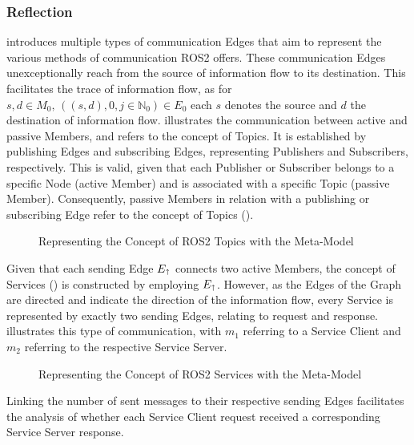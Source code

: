     \subsubsection{Reflection}
     introduces multiple types of communication Edges that aim to represent the various methods of communication ROS2 offers. These communication Edges unexceptionally reach from the source of information flow to its destination. This facilitates the trace of information flow, as for $s,d\in M_0,\, ((s,d),{0},j\in \mathbb{N}_0)\in E_0$ each $s$ denotes the source and $d$ the destination of information flow.\newline
     illustrates the communication between active and passive Members, and refers to the concept of Topics. It is established by publishing Edges and subscribing Edges, representing Publishers and Subscribers, respectively. This is valid, given that each Publisher or Subscriber belongs to a specific Node (active Member) and is associated with a specific Topic (passive Member). Consequently, passive Members in relation with a publishing or subscribing Edge refer to the concept of Topics ().
    \begin{figure}[h]
        \centering
        
        \caption[Representing the Concept of ROS2 Topics with the Meta-Model]{Representing the Concept of ROS2 Topics with the Meta-Model \legend} \label{fig:tikz:mathModel:pubsub}
    \end{figure}\newline 
    Given that each sending Edge $E_{\text{$\shortuparrow$}}$ connects two active Members, the concept of Services () is constructed by employing $E_{\text{$\shortuparrow$}}$. However, as the Edges of the Graph are directed and indicate the direction of the information flow, every Service is represented by exactly two sending Edges, relating to request and response.  illustrates this type of communication, with $m_1$ referring to a Service Client and $m_2$ referring to the respective Service Server.
    \begin{figure}[h]
        \centering
        
        \caption[Representing the Concept of ROS2 Services with the Meta-Model]{Representing the Concept of ROS2 Services with the Meta-Model \legend} \label{fig:tikz:mathModel:sending}
    \end{figure}
    Linking the number of sent messages to their respective sending Edges facilitates the analysis of whether each Service Client request received a corresponding Service Server response.

